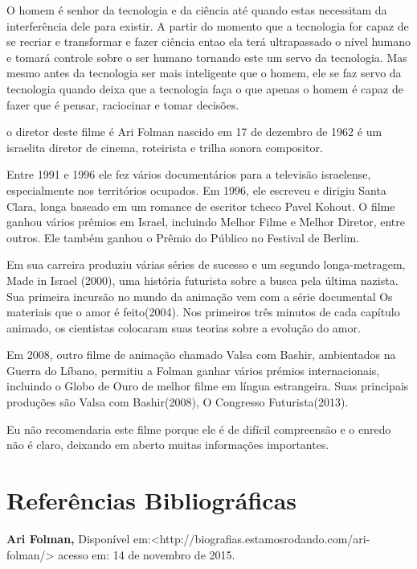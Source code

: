 \documentclass[a4paper,12pt]{article}
\begin{document}
	O homem é senhor da tecnologia e da ciência até quando estas necessitam da interferência dele para existir. A partir do momento que a tecnologia for capaz de se recriar e transformar e fazer ciência entao ela terá ultrapassado o nível humano e tomará controle sobre o ser humano tornando este um servo da tecnologia. Mas mesmo antes da tecnologia ser mais inteligente que o homem, ele se faz servo da tecnologia quando deixa que a tecnologia faça o que apenas o homem é capaz de fazer que é pensar, raciocinar e tomar decisões.
	
	o diretor deste filme é Ari Folman nascido em 17 de dezembro de 1962 é um israelita diretor de cinema, roteirista e trilha sonora compositor.
	
	Entre 1991 e 1996 ele fez vários documentários para a televisão israelense, especialmente nos territórios ocupados. Em 1996, ele escreveu e dirigiu Santa Clara, longa baseado em um romance de escritor tcheco Pavel Kohout. O filme ganhou vários prêmios em Israel, incluindo Melhor Filme e Melhor Diretor, entre outros. Ele também ganhou o Prêmio do Público no Festival de Berlim.
	
	Em sua carreira produziu várias séries de sucesso e um segundo longa-metragem, Made in Israel (2000), uma história futurista sobre a busca pela última nazista. Sua primeira incursão no mundo da animação vem com a série documental Os materiais que o amor é feito(2004). Nos primeiros três minutos de cada capítulo animado, os cientistas colocaram suas teorias sobre a evolução do amor.
	
	Em 2008, outro filme de animação chamado Valsa com Bashir, ambientados na Guerra do Líbano, permitiu a Folman ganhar vários prémios internacionais, incluindo o Globo de Ouro de melhor filme em língua estrangeira. Suas principais produções são Valsa com Bashir(2008),  O Congresso Futurista(2013).
	
	Eu não recomendaria este filme porque ele é de difícil compreensão e o enredo não é claro, deixando em aberto muitas informações importantes.
	\\
	
	\begin{center}
	\end{center}
	
	\section*{Referências Bibliográficas}
	
	\textbf{Ari Folman,} Disponível em:<http://biografias.estamosrodando.com/ari-folman/> acesso em: 14 de novembro de 2015. 
	
	
	
\end{document}
